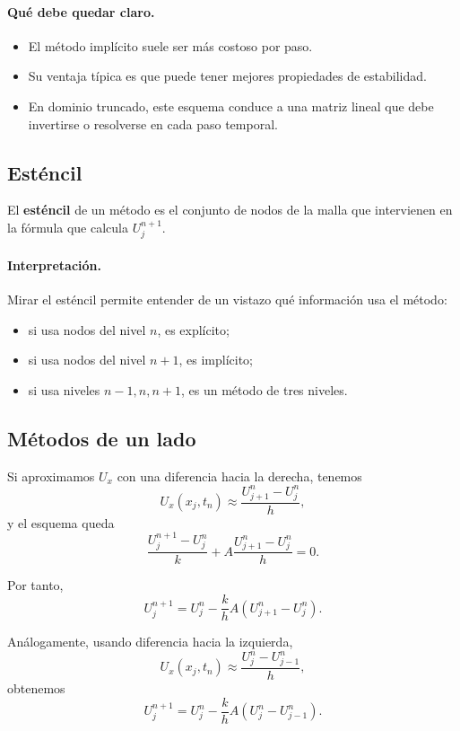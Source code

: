 \paragraph{Qué debe quedar claro.}
\begin{itemize}
    \item El método implícito suele ser más costoso por paso.
    \item Su ventaja típica es que puede tener mejores propiedades de estabilidad.
    \item En dominio truncado, este esquema conduce a una matriz lineal que debe invertirse o resolverse en cada paso temporal.
\end{itemize}

\subsection{Esténcil}

El \textbf{esténcil} de un método es el conjunto de nodos de la malla que intervienen en la fórmula que calcula \(U_j^{n+1}\).

\paragraph{Interpretación.}
Mirar el esténcil permite entender de un vistazo qué información usa el método:
\begin{itemize}
    \item si usa nodos del nivel \(n\), es explícito;
    \item si usa nodos del nivel \(n+1\), es implícito;
    \item si usa niveles \(n-1,n,n+1\), es un método de tres niveles.
\end{itemize}

\subsection{Métodos de un lado}

Si aproximamos \(U_x\) con una diferencia hacia la derecha, tenemos
\[
U_x(x_j,t_n)\approx \frac{U_{j+1}^n-U_j^n}{h},
\]
y el esquema queda
\[
\frac{U_j^{n+1}-U_j^n}{k}
+
A\frac{U_{j+1}^n-U_j^n}{h}
=0.
\]

Por tanto,
\[
U_j^{n+1}
=
U_j^n
-
\frac{k}{h}A\left(U_{j+1}^n-U_j^n\right).
\]

Análogamente, usando diferencia hacia la izquierda,
\[
U_x(x_j,t_n)\approx \frac{U_j^n-U_{j-1}^n}{h},
\]
obtenemos
\[
U_j^{n+1}
=
U_j^n
-
\frac{k}{h}A\left(U_j^n-U_{j-1}^n\right).
\]

